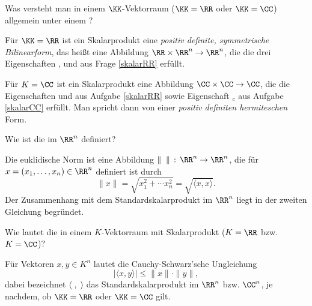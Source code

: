 \begin{frage}
  Was versteht man in einem $\KK$-Vektorraum 
  ($\KK=\RR$ oder $\KK=\CC$) allgemein unter einem ?
\end{frage}

\begin{antwort}
  Für $\KK=\RR$ ist ein Skalarprodukt eine \textit{positiv definite, symmetrische 
    Bilinearform}, das heißt eine Abbildung $\RR\times \RR^n \to \RR^n$, die  
  die drei Eigenschaften ,  und  
  aus Frage \ref{skalarRR} erfüllt.

  Für $K=\CC$ ist ein Skalarprodukt eine Abbildung $\CC\times\CC\to\CC$, 
  die die Eigenschaften  und  aus Aufgabe \ref{skalarRR} 
  sowie Eigenschaft 
  $_c$ aus Aufgabe \ref{skalarCC} erfüllt. 
  Man spricht dann von einer 
  \textit{positiv definiten hermiteschen} Form. 
  \AntEnd
\end{antwort}







\begin{frage}
  Wie ist die  im $\RR^n$ definiert?
\end{frage}

\begin{antwort}
  Die euklidische Norm ist eine Abbildung $\|\;\;\|\,:\, \RR^n \to \RR^n$, 
  die für $x=(x_1,\ldots,x_n)\in \RR^n$ definiert ist durch
  \[
  \| x \| = \sqrt{ x_1^2 +\cdots x_n^2 } = 
  \sqrt{ \langle x,x \rangle } .
  \]
  Der Zusammenhang mit dem Standardskalarprodukt im $\RR^n$ liegt 
  in der zweiten Gleichung begründet.
  \AntEnd
\end{antwort}






\begin{frage}
  Wie lautet die 
   in einem 
  $K$-Vektorraum mit Skalarprodukt ($K=\RR$ bzw. $K=\CC$)?
\end{frage}

\begin{antwort}
  Für Vektoren $x,y\in K^n$ lautet die Cauchy-Schwarz'sche Ungleichung 
  \begin{equation}
    | \langle x,y \rangle | \le \| x\|\cdot  \|y\|,  \tag{$\ast$}
  \end{equation}
  dabei bezeichnet $\langle \;,\; \rangle$ das Standardskalarprodukt 
  im $\RR^n$ bzw. $\CC^n$, je nachdem, ob $\KK=\RR$ oder $\KK=\CC$ gilt.
  \AntEnd
\end{antwort}


